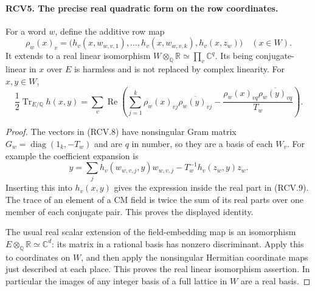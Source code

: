 \documentclass[11pt,a4paper]{article}
\numberwithin{equation}{section}
\theoremstyle{remark}\newtheorem{remark}[theorem]{Remark}
\begin{document}
\paragraph{RCV5. The precise real quadratic form on the row coordinates.}
\label{claim:RCV5}
For a word \(w\), define the additive row map
\[
 \rho_w(x)_v=
 \big(h_v(x,w_{w,v,1}),\ldots,h_v(x,w_{w,v,k}),h_v(x,z_w)\big)
       \quad(x\in W).
\tag{RCV.8}
\]
It extends to a real linear isomorphism
\(W\otimes_{\mathbb Q}\mathbb R\simeq\prod_v\mathbb C^q\).
Its being conjugate-linear in \(x\) over \(E\) is harmless and
is not replaced by complex linearity.  For \(x,y\in W\),
\[
 \frac12\operatorname{Tr}_{E/\mathbb Q}h(x,y)
 =\sum_v\operatorname{Re}\left(
    \sum_{j=1}^k \rho_w(x)_{vj}\overline{\rho_w(y)_{vj}}
       -\frac{\rho_w(x)_{vq}\overline{\rho_w(y)_{vq}}}{T_w}\right).
\tag{RCV.9}
\]
\begin{proof}
The vectors in (RCV.8) have nonsingular Gram matrix
\(G_w=\operatorname{diag}(1_k,-T_w)\) and are \(q\) in number,
so they are a basis of each \(W_v\).  For example the coefficient
expansion is
\[
 y=\sum_j h_v(w_{w,v,j},y)w_{w,v,j}
                         -T_w^{-1}h_v(z_w,y)z_w.
\]
Inserting this into \(h_v(x,y)\) gives the expression inside the
real part in (RCV.9).  The trace of an element of a CM field is
twice the sum of its real parts over one member of each conjugate
pair.  This proves the displayed identity.

The usual real scalar extension of the field-embedding map is an
isomorphism \(E\otimes_{\mathbb Q}\mathbb R\simeq\mathbb C^d\):
its matrix in a rational basis has nonzero discriminant.  Apply this
to coordinates on \(W\), and then apply the nonsingular Hermitian
coordinate maps just described at each place.  This proves the real
linear isomorphism assertion.  In particular the images of any
integer basis of a full lattice in \(W\) are a real basis.
\end{proof}

\end{document}

